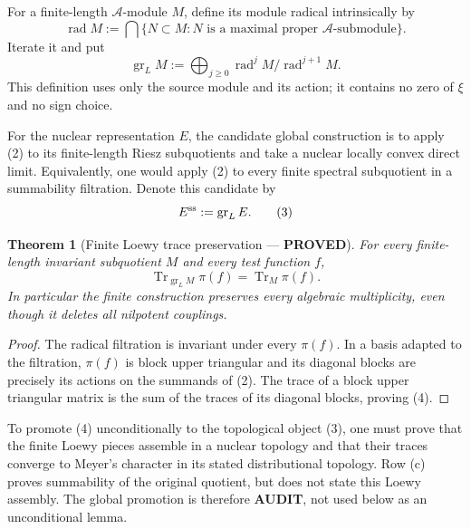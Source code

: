 \documentclass[11pt]{article}
\newcommand{\PROVED}{\textcolor{green!40!black}{\textbf{PROVED}}}
\newcommand{\AUDIT}{\textcolor{orange!70!black}{\textbf{AUDIT}}}
\newtheorem{theorem}{Theorem}
\begin{document}
For a finite-length $\mathcal A$-module $M$, define its module radical
intrinsically by
\[
 \operatorname{rad}M:=\bigcap\{N\subset M:N\text{ is a maximal proper
 }\mathcal A\text{-submodule}\}.
\]
Iterate it and put
\begin{equation}
 \operatorname{gr}_{L}M
 :=\bigoplus_{j\ge0}\operatorname{rad}^jM/
                         \operatorname{rad}^{j+1}M.  \tag{2}
\end{equation}
This definition uses only the source module and its action; it contains no
zero of $\xi$ and no sign choice.

For the nuclear representation $E$, the candidate global construction is to
apply (2) to its finite-length Riesz subquotients and take a nuclear locally
convex direct limit.  Equivalently, one would apply (2) to every finite
spectral subquotient in a summability filtration.  Denote this candidate by
\begin{equation}
                      E^{\rm ss}:=\operatorname{gr}_{L}E.       \tag{3}
\end{equation}

\begin{theorem}[Finite Loewy trace preservation --- \PROVED]
For every finite-length invariant subquotient $M$ and every test function
$f$,
\begin{equation}
          \operatorname{Tr}_{\operatorname{gr}_L M}\pi(f)
          =\operatorname{Tr}_{M}\pi(f).             \tag{4}
\end{equation}
In particular the finite construction preserves every algebraic
multiplicity, even though it deletes all nilpotent couplings.
\end{theorem}

\begin{proof}
The radical filtration is invariant under
every $\pi(f)$.  In a basis adapted to the filtration, $\pi(f)$ is block
upper triangular and its diagonal blocks are precisely its actions on the
summands of (2).  The trace of a block upper triangular matrix is the sum
of the traces of its diagonal blocks, proving (4).
\end{proof}

To promote (4) unconditionally to the topological object (3), one must prove that the finite
Loewy pieces assemble in a nuclear topology and that their traces converge
to Meyer's character in its stated distributional topology.  Row (c)
proves summability of the original quotient, but does not state this Loewy
assembly.  The global promotion is therefore \AUDIT, not used below as an
unconditional lemma.
\end{document}
